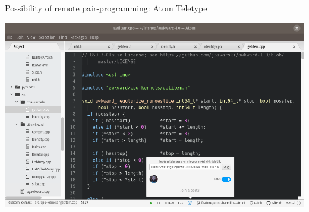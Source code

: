 \documentclass[aspectratio=169]{beamer}
\begin{document}
\begin{frame}{Possibility of remote pair-programming: Atom Teletype}
\vspace{0.05 cm}
\begin{center}
\includegraphics[width=0.9\linewidth]{atom-teletype.png}
\end{center}
\end{frame}
\end{document}
